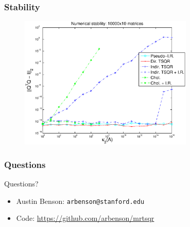 \documentclass{beamer}
\begin{document}
\begin{frame}
\frametitle{Stability}

\begin{figure}[h!]
\centering
\includegraphics[height=2.5in]{"figs/stability"}
\end{figure}

\end{frame}


\begin{frame}
\frametitle{Questions}

Questions?

\vspace{0.2in}

\begin{itemize}
\setlength{\itemsep}{0.1in}
\item Austin Benson: \texttt{arbenson@stanford.edu}
\item Code: \url{https://github.com/arbenson/mrtsqr}
\end{itemize}

\end{frame}
\end{document}

